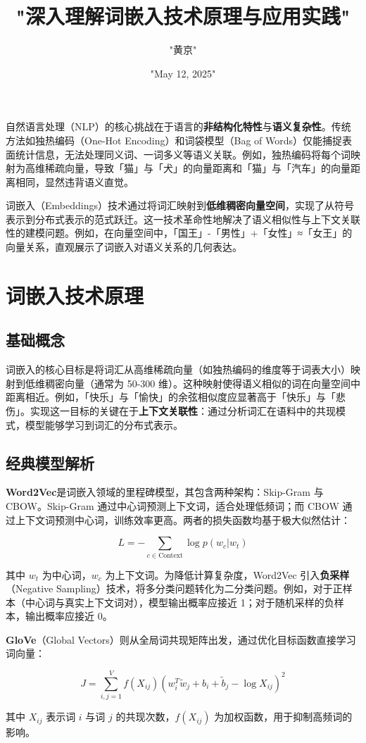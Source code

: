 \title{"深入理解词嵌入技术原理与应用实践"}
\author{"黄京"}
\date{"May 12, 2025"}
\maketitle
自然语言处理（NLP）的核心挑战在于语言的\textbf{非结构化特性}与\textbf{语义复杂性}。传统方法如独热编码（One-Hot Encoding）和词袋模型（Bag of Words）仅能捕捉表面统计信息，无法处理同义词、一词多义等语义关联。例如，独热编码将每个词映射为高维稀疏向量，导致「猫」与「犬」的向量距离和「猫」与「汽车」的向量距离相同，显然违背语义直觉。\par
词嵌入（Embeddings）技术通过将词汇映射到\textbf{低维稠密向量空间}，实现了从符号表示到分布式表示的范式跃迁。这一技术革命性地解决了语义相似性与上下文关联性的建模问题。例如，在向量空间中，「国王」-「男性」+「女性」≈「女王」的向量关系，直观展示了词嵌入对语义关系的几何表达。\par
\chapter{词嵌入技术原理}
\section{基础概念}
词嵌入的核心目标是将词汇从高维稀疏向量（如独热编码的维度等于词表大小）映射到低维稠密向量（通常为 50-300 维）。这种映射使得语义相似的词在向量空间中距离相近。例如，「快乐」与「愉快」的余弦相似度应显著高于「快乐」与「悲伤」。实现这一目标的关键在于\textbf{上下文关联性}：通过分析词汇在语料中的共现模式，模型能够学习到词汇的分布式表示。\par
\section{经典模型解析}
\textbf{Word2Vec}是词嵌入领域的里程碑模型，其包含两种架构：Skip-Gram 与 CBOW。Skip-Gram 通过中心词预测上下文词，适合处理低频词；而 CBOW 通过上下文词预测中心词，训练效率更高。两者的损失函数均基于极大似然估计：\par
$$ L = -\sum_{c \in \text{Context}} \log p(w_c | w_t) $$\par
其中 $w_t$ 为中心词，$w_c$ 为上下文词。为降低计算复杂度，Word2Vec 引入\textbf{负采样}（Negative Sampling）技术，将多分类问题转化为二分类问题。例如，对于正样本（中心词与真实上下文词对），模型输出概率应接近 1；对于随机采样的负样本，输出概率应接近 0。\par
\textbf{GloVe}（Global Vectors）则从全局词共现矩阵出发，通过优化目标函数直接学习词向量：\par
$$ J = \sum_{i,j=1}^V f(X_{ij}) (w_i^T \tilde{w}_j + b_i + \tilde{b}_j - \log X_{ij})^2 $$\par
其中 $X_{ij}$ 表示词 $i$ 与词 $j$ 的共现次数，$f(X_{ij})$ 为加权函数，用于抑制高频词的影响。\par
